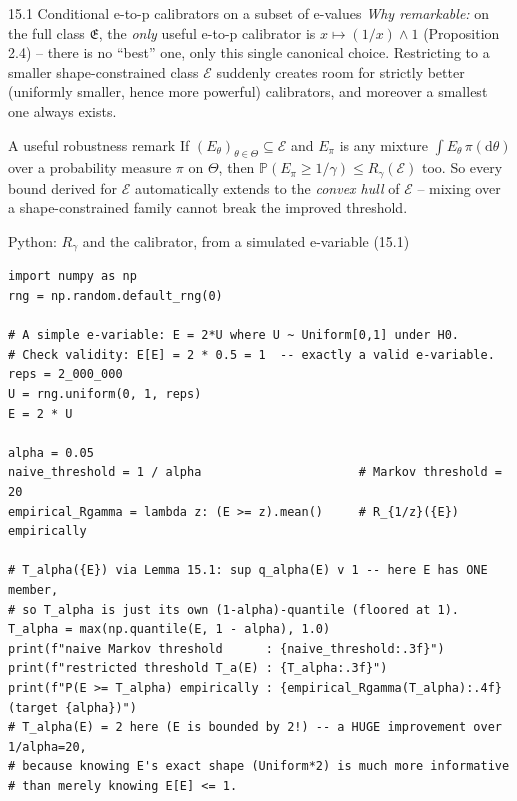 \documentclass[aspectratio=169,10pt]{beamer}
\newcommand{\PP}{\mathbb{P}}
\newcommand{\calE}{\mathcal{E}}
\newcommand{\frakE}{\mathfrak{E}}
\begin{document}
\begin{frame}[allowframebreaks]{15.1 Conditional e-to-p calibrators on a subset of e-values}
  \emph{Why remarkable:} on the full class $\frakE$, the \emph{only} useful e-to-p calibrator is $x\mapsto(1/x)\wedge1$ (Proposition 2.4) -- there is no ``best'' one, only this single canonical choice. Restricting to a smaller shape-constrained class $\calE$ suddenly creates room for strictly better (uniformly smaller, hence more powerful) calibrators, and moreover a smallest one always exists.

  \begin{block}{A useful robustness remark}
    If $(E_\theta)_{\theta\in\Theta}\subseteq\calE$ and $E_\pi$ is any mixture $\int E_\theta\,\pi(\mathrm d\theta)$ over a probability measure $\pi$ on $\Theta$, then $\PP(E_\pi\ge1/\gamma)\le R_\gamma(\calE)$ too. So every bound derived for $\calE$ automatically extends to the \emph{convex hull} of $\calE$ -- mixing over a shape-constrained family cannot break the improved threshold.
  \end{block}
\end{frame}

\begin{frame}[fragile]{Python: $R_\gamma$ and the calibrator, from a simulated e-variable (15.1)}
  \begin{lstlisting}
import numpy as np
rng = np.random.default_rng(0)

# A simple e-variable: E = 2*U where U ~ Uniform[0,1] under H0.
# Check validity: E[E] = 2 * 0.5 = 1  -- exactly a valid e-variable.
reps = 2_000_000
U = rng.uniform(0, 1, reps)
E = 2 * U

alpha = 0.05
naive_threshold = 1 / alpha                      # Markov threshold = 20
empirical_Rgamma = lambda z: (E >= z).mean()     # R_{1/z}({E}) empirically

# T_alpha({E}) via Lemma 15.1: sup q_alpha(E) v 1 -- here E has ONE member,
# so T_alpha is just its own (1-alpha)-quantile (floored at 1).
T_alpha = max(np.quantile(E, 1 - alpha), 1.0)
print(f"naive Markov threshold      : {naive_threshold:.3f}")
print(f"restricted threshold T_a(E) : {T_alpha:.3f}")
print(f"P(E >= T_alpha) empirically : {empirical_Rgamma(T_alpha):.4f} (target {alpha})")
# T_alpha(E) = 2 here (E is bounded by 2!) -- a HUGE improvement over 1/alpha=20,
# because knowing E's exact shape (Uniform*2) is much more informative
# than merely knowing E[E] <= 1.
  \end{lstlisting}
\end{frame}
\end{document}
